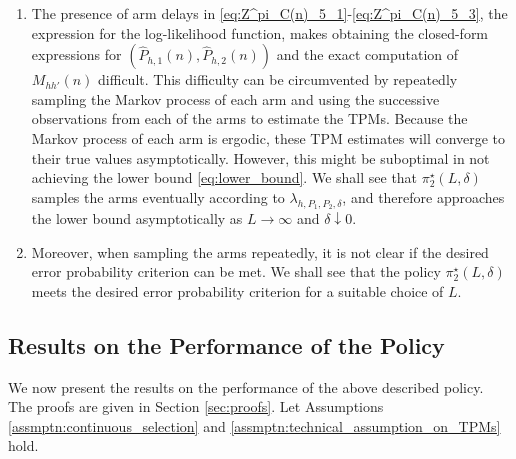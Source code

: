 \begin{remark}
\label{rem:incomputability_of_M_hh'(n)}
\begin{enumerate}
	\item The presence of arm delays in \eqref{eq:Z^pi_C(n)_5_1}-\eqref{eq:Z^pi_C(n)_5_3}, the expression for the log-likelihood function, makes obtaining the closed-form expressions for $(\hat{P}_{h, 1}(n), \hat{P}_{h, 2}(n))$ and the exact computation of $M_{hh'}(n)$ difficult. This difficulty can be circumvented by repeatedly sampling the Markov process of each arm and using the successive observations from each of the arms to estimate the TPMs. Because the Markov process of each arm is ergodic, these TPM estimates will converge to their true values asymptotically. However, this might be suboptimal in not achieving the lower bound \eqref{eq:lower_bound}. We shall see that $\pi_2^\star(L, \delta)$ samples the arms eventually according to $\lambda_{h, P_1, P_2, \delta}$, and therefore approaches the lower bound asymptotically as $L\to \infty$ and $\delta \downarrow 0$.
	\item Moreover, when sampling the arms repeatedly, it is not clear if the desired error probability criterion can be met. We shall see that the policy $\pi_2^\star(L, \delta)$ meets the desired error probability criterion for a suitable choice of $L$.
\end{enumerate}
\end{remark}	

\subsection{Results on the Performance of the Policy}
We now present the results on the performance of the above described policy. The proofs are given in Section \ref{sec:proofs}. Let Assumptions \ref{assmptn:continuous_selection} and \ref{assmptn:technical_assumption_on_TPMs} hold.

